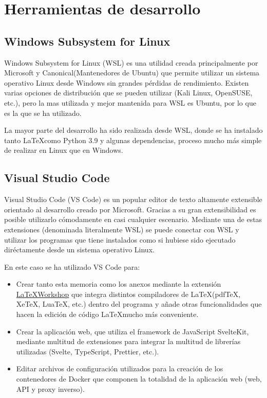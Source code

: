 \label{cha:Técnicas y herraminetas}

\section{Herramientas de desarrollo}

\subsection{Windows Subsystem for Linux}

Windows Subsystem for Linux (WSL) es una utilidad creada principalmente por
Microsoft y Canonical(Mantenedores de Ubuntu) que permite utilizar un sistema
operativo Linux desde Windows sin grandes pérdidas de rendimiento. Existen
varias opciones de distribución que se pueden utilizar (Kali Linux, OpenSUSE,
etc.), pero la mas utilizada y mejor mantenida para WSL es Ubuntu, por lo que es
la que se ha utilizado.

La mayor parte del desarrollo ha sido realizada desde WSL, donde se ha instalado
tanto \LaTeX como Python 3.9 y algunas dependencias, proceso mucho más simple de
realizar en Linux que en Windows.

\subsection{Visual Studio Code}

Visual Studio Code (VS Code) es un popular editor de texto altamente extensible
orientado al desarrollo creado por Microsoft. Gracias a su gran extensibilidad
es posible utilizarlo cómodamente en casi cualquier escenario. Mediante una de
estas extensiones (denominada literalmente WSL) se puede conectar con WSL y
utilizar los programas que tiene instalados como si hubiese sido ejecutado
diréctamente desde un sistema operativo Linux.

En este caso se ha utilizado VS Code para:

\begin{itemize}
    \item Crear tanto esta memoria como los anexos mediante la extensión
          \href{https://github.com/James-Yu/LaTeX-Workshop}{\LaTeX Workshop} que
          integra distintos compiladores de \LaTeX (pdfTeX, XeTeX, LuaTeX, etc.)
          dentro del programa y añade otras funcionalidades que hacen la edición
          de código \LaTeX mucho más conveniente.
    \item Crear la aplicación web, que utiliza el framework de JavaScript
          SvelteKit, mediante multitud de extensiones para integrar la multitud
          de librerías utilizadas (Svelte, TypeScript, Prettier, etc.).
    \item Editar archivos de configuración utilizados para la creación de los
          contenedores de Docker que componen la totalidad de la aplicación web
          (web, API y proxy inverso).
\end{itemize}

